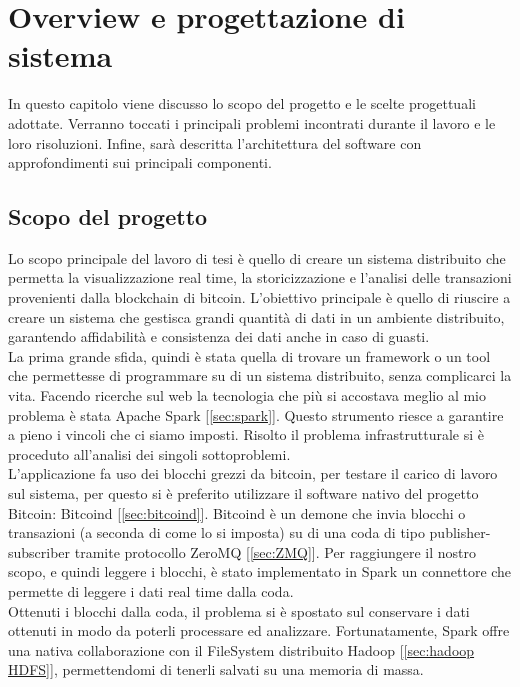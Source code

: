 \chapter{Overview e progettazione di sistema}
\label{chap:overview e progettazione di sistema}
In questo capitolo viene discusso lo scopo del progetto e le scelte progettuali adottate. Verranno toccati i principali problemi incontrati durante il lavoro e le loro risoluzioni. Infine, sarà descritta l'architettura del software con approfondimenti sui principali componenti.

\section{Scopo del progetto}
\label{sec:scopo del progetto}
Lo scopo principale del lavoro di tesi è quello di creare un sistema distribuito che permetta la visualizzazione real time, la storicizzazione e l'analisi delle transazioni  provenienti dalla blockchain di bitcoin. L'obiettivo principale è quello di riuscire a creare un sistema che gestisca grandi quantità di dati in un ambiente distribuito, garantendo affidabilità e consistenza dei dati anche in caso di guasti.
\\La prima grande sfida, quindi è stata quella di trovare un framework o un tool che permettesse di programmare su di un sistema distribuito, senza complicarci la vita. Facendo ricerche sul web la tecnologia che più si accostava meglio al mio problema è stata Apache Spark [\ref{sec:spark}]. Questo strumento riesce a garantire a pieno i vincoli che ci siamo imposti. Risolto il problema infrastrutturale si è proceduto all'analisi dei singoli sottoproblemi. 
\\L'applicazione fa uso dei blocchi grezzi da bitcoin, per testare il carico di lavoro sul sistema, per questo si è preferito utilizzare il software nativo del progetto Bitcoin: Bitcoind [\ref{sec:bitcoind}]. Bitcoind è un demone che invia blocchi o transazioni (a seconda di come lo si imposta) su di una coda di tipo publisher-subscriber tramite protocollo ZeroMQ [\ref{sec:ZMQ}]. Per raggiungere il nostro scopo, e quindi leggere i blocchi, è stato implementato in Spark un connettore che permette di leggere i dati real time dalla coda.
\\Ottenuti i blocchi dalla coda, il problema si è spostato sul conservare i dati ottenuti in modo da poterli processare ed analizzare. Fortunatamente, Spark offre una nativa collaborazione con il FileSystem distribuito Hadoop [\ref{sec:hadoop HDFS}], permettendomi di tenerli salvati su una memoria di massa.
